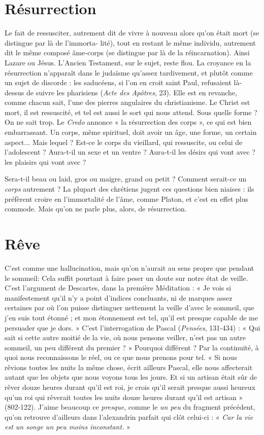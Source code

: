 \section{Résurrection}
Le fait de ressusciter, autrement dit de vivre à nouveau
alors qu’on était mort (se distingue par là de l’immorta-
lité), tout en restant le même individu, autrement dit le même composé âme-corps
(se distingue par là de la réincarnation). Ainsi Lazare ou Jésus. L’Ancien
Testament, sur le sujet, reste flou. La croyance en la résurrection n’apparaît
dans le judaïsme qu’assez tardivement, et plutôt comme un sujet de discorde :
les saducéens, si l’on en croit saint Paul, refusaient là-dessus de suivre les pharisiens
({\it Acte des Apôtres}, 23). Elle est en revanche, comme chacun sait, l’une des
pierres angulaires du christianisme. Le Christ est mort, il est ressuscité, et tel est
aussi le sort qui nous attend. Sous quelle forme ? On ne sait trop. Le {\it Credo}
annonce « la résurrection des corps », ce qui est bien embarrassant. Un corps,
même spirituel, doit avoir un âge, une forme, un certain aspect... Mais lequel ?
Est-ce le corps du vieillard, qui ressuscite, ou celui de l’adolescent ? Aura-t-il un
sexe et un ventre ? Aura-t-il les désirs qui vont avec ? les plaisirs qui vont avec ?

Sera-t-il beau ou laid, gros ou maigre, grand ou petit ? Comment serait-ce un
{\it corps} autrement ? La plupart des chrétiens jugent ces questions bien niaises : ils
préfèrent croire en l’immortalité de l’âme, comme Platon, et c’est en effet plus
commode. Mais qu’on ne parle plus, alors, de résurrection.

\section{Rêve}
C’est comme une hallucination, mais qu’on n’aurait au sens propre
que pendant le sommeil: Cela suffit pourtant à faire peser un doute
sur notre état de veille. C’est l’argument de Descartes, dans la première
Méditation : « Je vois si manifestement qu’il n’y a point d’indices concluants,
ni de marques assez certaines par où l’on puisse distinguer nettement la veille
d’avec le sommeil, que j’en suis tout étonné ; et mon étonnement est tel, qu’il
est presque capable de me persuader que je dors. » C’est l'interrogation de
Pascal ({\it Pensées}, 131-434) : « Qui sait si cette autre moitié de la vie, où nous
pensons veiller, n’est pas un autre sommeil, un peu différent du premier ? »
Pourquoi différent ? Par la continuité, à quoi nous reconnaissons le réel, ou ce
que nous prenons pour tel. « Si nous rêvions toutes les nuits la même chose,
écrit ailleurs Pascal, elle nous affecterait autant que les objets que nous voyons
tous les jours. Et si un artisan était sûr de rêver douze heures durant qu’il est
roi, je crois qu'il serait presque aussi heureux qu’un roi qui rêverait toutes les
nuits douze heures durant qu’il est artisan » (802-122). J'aime beaucoup ce
{\it presque}, comme le {\it un peu} du fragment précédent, qu’on retrouve d’ailleurs
dans l’alexandrin parfait qui clôt celui-ci : « {\it Car la vie est un songe un peu moins
inconstant.} »

